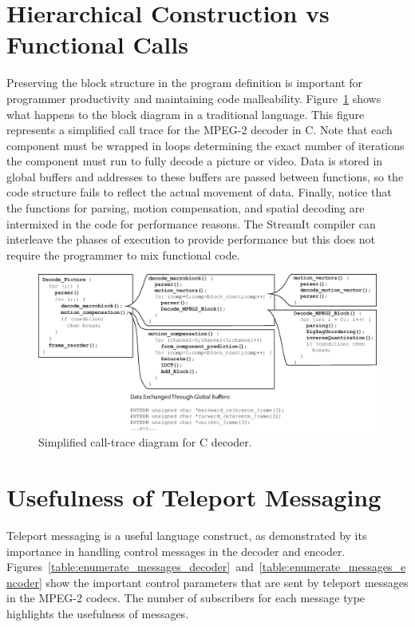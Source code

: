 \section{Hierarchical Construction vs Functional Calls}
\label{sec:hier}

Preserving the block structure in the program definition is important for
programmer productivity and maintaining code malleability. 
Figure~\ref{fig:call-diagram}
shows what happens to the block diagram in a traditional language. This figure
represents a simplified call trace for the MPEG-2 decoder in C. 
Note that each component must be wrapped in loops determining the exact number 
of iterations the component must run to fully decode a picture or video. 
Data is stored in global buffers and addresses to these buffers are passed between
functions, so the code structure fails to reflect the actual movement of data.
Finally, notice that the functions for parsing, motion compensation, and spatial decoding are
intermixed in the code for performance reasons.
The StreamIt compiler can interleave the phases of execution to provide performance
but this does not require the programmer to mix functional code.

\begin{figure}[h]
  \begin{center}
    \includegraphics[scale=0.5, angle=0]{./call_diagram.eps}
    \caption{Simplified call-trace diagram for C decoder.}
    \label{fig:call-diagram}
  \end{center}
\end{figure}

\section{Usefulness of Teleport Messaging}
\label{sec:teleport_useful}

Teleport messaging is a useful language construct, as 
demonstrated by its importance in handling control messages 
in the decoder and encoder. 
Figures~\ref{table:enumerate_messages_decoder}~and~\ref{table:enumerate_messages_encoder} 
show the important control parameters that are sent by 
teleport messages in the MPEG-2 codecs. The number of 
subscribers for each message type highlights the usefulness 
of messages. 

